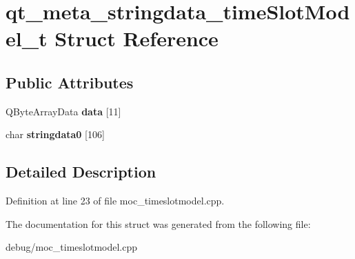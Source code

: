 \hypertarget{structqt__meta__stringdata__time_slot_model__t}{}\section{qt\+\_\+meta\+\_\+stringdata\+\_\+time\+Slot\+Model\+\_\+t Struct Reference}
\label{structqt__meta__stringdata__time_slot_model__t}
\subsection*{Public Attributes}
\begin{DoxyCompactItemize}
\item 
\mbox{\label{structqt__meta__stringdata__time_slot_model__t_a81939825efd5726f46d05db0eab55f15}} 
Q\+Byte\+Array\+Data {\bfseries data} \mbox{[}11\mbox{]}
\item 
\mbox{\label{structqt__meta__stringdata__time_slot_model__t_afcb577a86183d1a16b87460df8ee1eab}} 
char {\bfseries stringdata0} \mbox{[}106\mbox{]}
\end{DoxyCompactItemize}


\subsection{Detailed Description}


Definition at line 23 of file moc\+\_\+timeslotmodel.\+cpp.



The documentation for this struct was generated from the following file\+:\begin{DoxyCompactItemize}
\item 
debug/moc\+\_\+timeslotmodel.\+cpp\end{DoxyCompactItemize}
